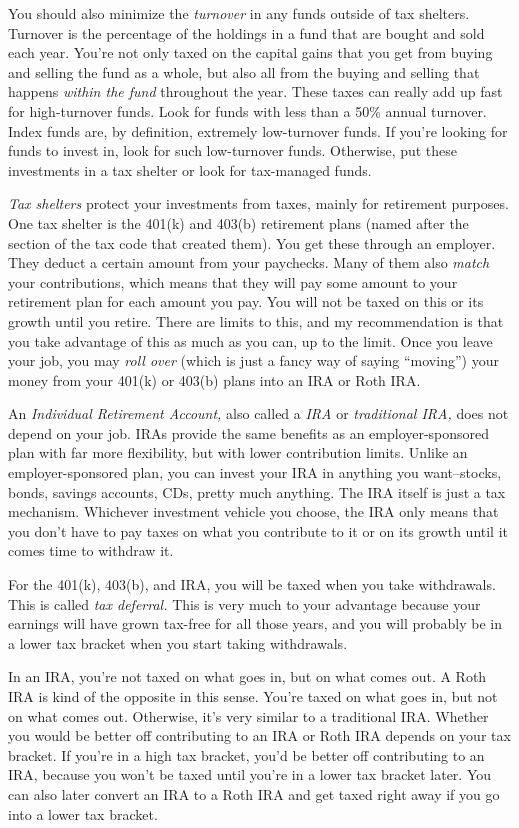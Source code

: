 You should also minimize the \emph{turnover} in any funds outside of tax shelters. Turnover is the percentage of the holdings in a fund that are bought and sold each year. You're not only taxed on the capital gains that you get from buying and selling the fund as a whole, but also all from the buying and selling that happens \emph{within the fund} throughout the year. These taxes can really add up fast for high-turnover funds. Look for funds with less than a 50\% annual turnover. Index funds are, by definition, extremely low-turnover funds. If you're looking for funds to invest in, look for such low-turnover funds. Otherwise, put these investments in a tax shelter or look for tax-managed funds.

\emph{Tax shelters} protect your investments from taxes, mainly for retirement purposes. One tax shelter is the 401(k) and 403(b) retirement plans (named after the section of the tax code that created them). You get these through an employer. They deduct a certain amount from your paychecks. Many of them also \emph{match} your contributions, which means that they will pay some amount to your retirement plan for each amount you pay. You will not be taxed on this or its growth until you retire. There are limits to this, and my recommendation is that you take advantage of this as much as you can, up to the limit. Once you leave your job, you may \emph{roll over} (which is just a fancy way of saying ``moving'') your money from your 401(k) or 403(b) plans into an IRA or Roth IRA.

An \emph{Individual Retirement Account,} also called a \emph{IRA} or \emph{traditional IRA,} does not depend on your job. IRAs provide the same benefits as an employer-sponsored plan with far more flexibility, but with lower contribution limits. Unlike an employer-sponsored plan, you can invest your IRA in anything you want--stocks, bonds, savings accounts, CDs, pretty much anything. The IRA itself is just a tax mechanism. Whichever investment vehicle you choose, the IRA only means that you don't have to pay taxes on what you contribute to it or on its growth until it comes time to withdraw it.

For the 401(k), 403(b), and IRA, you will be taxed when you take withdrawals. This is called \emph{tax deferral.} This is very much to your advantage because your earnings will have grown tax-free for all those years, and you will probably be in a lower tax bracket when you start taking withdrawals.

In an IRA, you're not taxed on what goes in, but on what comes out. A Roth IRA is kind of the opposite in this sense. You're taxed on what goes in, but not on what comes out. Otherwise, it's very similar to a traditional IRA. Whether you would be better off contributing to an IRA or Roth IRA depends on your tax bracket. If you're in a high tax bracket, you'd be better off contributing to an IRA, because you won't be taxed until you're in a lower tax bracket later. You can also later convert an IRA to a Roth IRA and get taxed right away if you go into a lower tax bracket.

